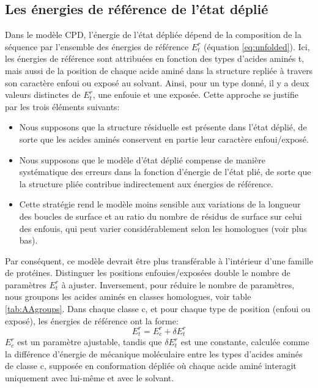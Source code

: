 \subsection{Les énergies de référence de l'état déplié}

Dans le modèle CPD, l'énergie de l'état dépliée dépend de la composition de la séquence par l'ensemble des énergies de référence $E^r_t$ (équation \ref{eq:unfolded}). Ici, les énergies de référence sont attribuées en fonction des types d'acides aminés t, mais aussi de la position de chaque acide aminé dans la structure repliée à travers son caractère enfoui ou exposé au solvant. Ainsi, pour un type donné, il y a deux valeurs distinctes de $E^r_t$, une enfouie et une exposée. Cette approche se justifie par les trois éléments suivants:

\begin{itemize}
\item Nous supposons que la structure résiduelle est présente dans l'état déplié, de sorte que les acides aminés conservent en partie leur caractère enfoui/exposé.
\item Nous supposons que le modèle d'état déplié compense de manière systématique des erreurs dans la fonction d'énergie de l'état plié, de sorte que  la structure pliée contribue indirectement aux énergies de référence.
\item Cette stratégie rend le modèle moins sensible aux variations de la longueur des boucles de surface et au ratio  du nombre de résidus de surface sur  celui des enfouis, qui peut varier considérablement selon les homologues (voir plus bas).  
\end{itemize}
Par conséquent, ce modèle devrait être plus transférable à l'intérieur d'une famille de protéines. Distinguer les positions enfouies/exposées double le nombre de paramètres $E^r_t$ à ajuster. Inversement, pour réduire le nombre de paramètres, nous groupons les acides aminés en classes homologues, voir table \ref{tab:AAgroups}. Dans chaque classe c, et pour chaque type de position (enfoui ou exposé), les énergies de référence ont la forme:
\begin{equation}
E^r_t = E^r_c + \delta E^r_t
\end{equation}
$E^r_c$ est un paramètre ajustable, tandis que $\delta E^r_t$ est une constante, calculée comme la différence d'énergie de mécanique moléculaire entre les types d'acides aminés de classe c, supposée en conformation dépliée où chaque acide aminé interagit uniquement avec lui-même et avec le solvant.

